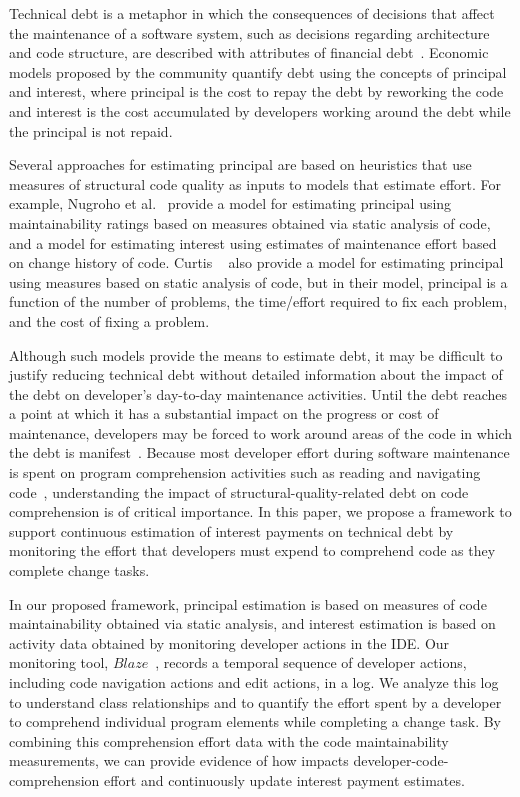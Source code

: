 Technical debt is a metaphor in which the consequences of decisions that affect the maintenance of a software system, such as decisions regarding architecture and code structure, are described with attributes of financial debt~\cite{Cunningham:1992}. Economic models proposed by the \TD community quantify debt using the concepts of principal and interest, where principal is the cost to repay the debt by reworking the code and interest is the cost accumulated by developers working around the debt while the principal is not repaid.

Several approaches for estimating principal are based on heuristics that use measures of structural code quality as inputs to models that estimate effort. For example, Nugroho et al.~\cite{Nugroho_etal:2011} provide a model for estimating principal using maintainability ratings based on measures obtained via static analysis of code, and a model for estimating interest using estimates of maintenance effort based on change history of code. Curtis \etal~\cite{Curtis_etal:2012} also provide a model for estimating principal using measures based on static analysis of code, but in their model, principal is a function of the number of problems, the time/effort required to fix each problem, and the cost of fixing a problem.  

Although such models provide the means to estimate debt, it may be difficult to justify reducing technical debt without detailed information about the impact of the debt on developer's day-to-day maintenance activities. Until the debt reaches a point at which it has a substantial impact on the progress or cost of maintenance, developers may be forced to work around areas of the code in which the debt is manifest~\cite{Ozkaya_etal:2011}. Because most developer effort during software maintenance is spent on program comprehension activities such as reading and navigating code~\cite{Fjeldstad_Hamlen:1982,Standish:1984,vonMayrhauser_etal:1997,Ko_etal:2006,LaToza_etal:2006,Tiarks:2011}, understanding the impact of structural-quality-related debt on code comprehension is of critical importance. In this paper, we propose a framework to support continuous estimation of interest payments on technical debt by monitoring the effort that developers must expend to comprehend code as they complete change tasks. 

In our proposed framework, principal estimation is based on measures of code maintainability obtained via static analysis, and interest estimation is based on activity data obtained by monitoring developer actions in the IDE. Our monitoring tool, $Blaze$~\cite{Snipes_etal:2014}, records a temporal sequence of developer actions, including code navigation actions and edit actions, in a log. We analyze this log to understand class relationships and to quantify the effort spent by a developer to comprehend individual program elements while completing a change task. By combining this comprehension effort data with the code maintainability measurements, we can provide evidence of how \TD impacts developer-code-comprehension effort and continuously update interest payment estimates.

